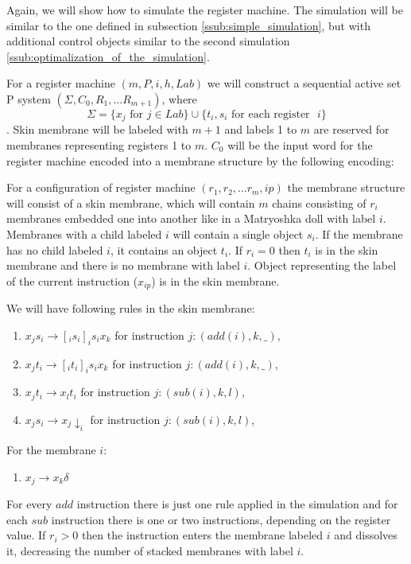     \begin{dokaz}
      Again, we will show how to simulate the register machine. The simulation will be similar to the one defined in subsection \ref{ssub:simple_simulation}, but with additional control objects similar to the second simulation \ref{ssub:optimalization_of_the_simulation}.

      For a register machine $(m,P,i,h,Lab)$ we will construct a sequential active set P system $(\Sigma, C_0, R_1, \ldots R_{m+1})$, where $$\Sigma = \{x_j \text{~for~} j\in Lab\}\cup\{t_i, s_i \text{~for each register ~}i\}$$. Skin membrane will be labeled with $m+1$ and labels 1 to $m$ are reserved for membranes representing registers 1 to $m$. $C_0$ will be the input word for the register machine encoded into a membrane structure by the following encoding: 

      For a configuration of register machine $(r_1, r_2, \ldots r_m, ip)$ the membrane structure will consist of a skin membrane, which will contain $m$ chains consisting of $r_i$ membranes embedded one into another like in a Matryoshka doll with label $i$. Membranes with a child labeled $i$ will contain a single object $s_i$. If the membrane has no child labeled $i$, it contains an object $t_i$. If $r_i = 0$ then $t_i$ is in the skin membrane and there is no membrane with label $i$. Object representing the label of the current instruction ($x_{ip}$) is in the skin membrane.

      We will have following rules in the skin membrane:
      \begin{enumerate}
        \item\label{wrap_skin_add_s} $x_j s_i\rightarrow [_i s_i ]_i s_i x_k$ for instruction $j: (add(i), k, \_)$,
        \item\label{wrap_skin_add_t} $x_j t_i\rightarrow [_i t_i ]_i s_i x_k$ for instruction $j: (add(i), k, \_)$,
        \item\label{wrap_skin_sub_t} $x_j t_i\rightarrow x_l t_i$ for instruction $j: (sub(i), k, l)$,
        \item\label{wrap_skin_sub_s} $x_j s_i\rightarrow x_j\downarrow_i$ for instruction $j: (sub(i), k, l)$,
      \end{enumerate}

      For the membrane $i$:
      \begin{enumerate}[resume]
        \item\label{wrap_inner_dissolve} $x_j \rightarrow x_k\delta$
      \end{enumerate}

      For every $add$ instruction there is just one rule applied in the simulation and for each $sub$ instruction there is one or two instructions, depending on the register value. If $r_i>0$ then the instruction enters the membrane labeled $i$ and dissolves it, decreasing the number of stacked membranes with label $i$.
    \end{dokaz}

